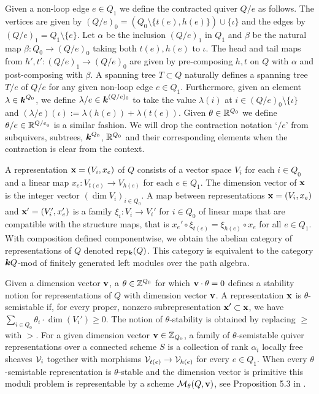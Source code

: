 \documentclass{amsart}
\theoremstyle{definition}
\begin{document}
Given a non-loop edge $e \in Q_1$ we define the contracted quiver $Q/e$ as follows. The vertices are given by $(Q/e)_0 = (Q_0 \setminus \{t(e),h(e)\}) \cup \{\iota\}$ and the edges by $(Q/e)_1 = Q_1 \setminus \{e\}$. 
Let $\alpha$ be the inclusion $(Q/e)_1$ in $Q_1$ and $\beta$ be the natural map $\beta \colon Q_0 \rightarrow (Q/e)_0$ taking both $t(e),h(e)$ to $\iota$. 
The head and tail maps from $h',t' \colon (Q/e)_1 \rightarrow (Q/e)_0$ are given by pre-composing $h,t$ on $Q$ with $\alpha$ and post-composing with $\beta$.
A spanning tree $T \subset Q$ naturally defines a spanning tree $T/e$ of $Q/e$ for any given non-loop edge $e\in Q_1$.
Furthermore, given an element $\lambda \in {\boldsymbol{k}}^{Q_0}$, we define $\lambda/e \in {\boldsymbol{k}}^{(Q/e)_0}$ to take the value $\lambda(i)$ at $i \in (Q/e)_0 \setminus \{\iota\}$ and $(\lambda/e)(\iota):=\lambda(h(e))+\lambda(t(e))$.
Given $\theta \in \mathbb{R}^{Q_0}$ we define $\theta/e \in \mathbb{R}^{{Q/e}_0}$ is a similar fashion.
We will drop the contraction notation `$/e$' from subquivers, subtrees, ${\boldsymbol{k}}^{Q_0}$, $\mathbb{R}^{Q_0}$ and their corresponding elements when the contraction is clear from the context.

A representation $\mathbf{x} = (V_i, x_e)$ of $Q$ consists of a vector space $V_i$ for each $i \in Q_0$ and a linear map $x_e \colon V_{t(e)} \rightarrow V_{h(e)}$ for each $e \in Q_1$. 
The dimension vector of $\mathbf{x}$ is the integer vector $(\dim V_{i})_{i\in Q_0}$.  
A map between representations $\mathbf{x} = (V_i, x_e)$ and $\mathbf{x}' = (V_i', x_e')$ is a family $\xi_{i} \colon V_i^{\,} \rightarrow V_i'$ for $i \in Q_0$ of linear maps that are compatible with the structure maps, that is $x_e' \circ\xi_{t(e)} = \xi_{h(e)} \circ x_e$ for all $e \in Q_1$.  
With composition defined componentwise, we obtain the abelian category of representations of $Q$ denoted rep$_{\boldsymbol{k}}(Q)$. 
This category is equivalent to the category ${\boldsymbol{k}} Q$-mod of finitely generated left modules over the path algebra.

Given a dimension vector $\mathbf{v}$, a $\theta \in \mathbb{Z}^{Q_0}$ for which $\mathbf{v} \cdot \theta=0$ defines a stability notion for representations of $Q$ with dimension vector $\mathbf{v}$.
A representation $\mathbf{x}$ is $\theta$-semistable if, for every proper, nonzero subrepresentation $\mathbf{x}' \subset \mathbf{x}$, we have $\sum_{i \in Q_0} \theta_i \cdot \dim(V_i') \geq 0$.  
The notion of $\theta$-stability is obtained by replacing $\geq$ with $>$. 
For a given dimension vector $\mathbf{v} \in \mathbb{Z}_{Q_0}$, a family of $\theta$-semistable quiver representations over a connected scheme $S$ is a collection of rank $\alpha_i$ locally free sheaves $\mathcal{V}_i$ together with morphisms $\mathcal{V}_{t(e)} \rightarrow \mathcal{V}_{h(e)}$ for every $e\in Q_1$. 
When every $\theta$-semistable representation is $\theta$-stable and the dimension vector is primitive this moduli problem is representable by a scheme $\mathcal{M}_\theta(Q, \mathbf{v})$, see Proposition 5.3 in \cite{King}.
\end{document}
